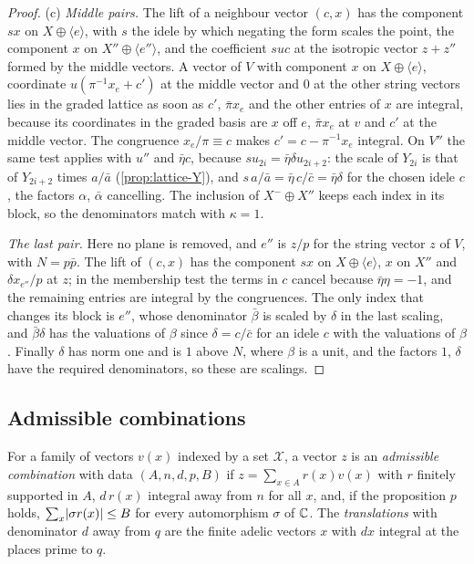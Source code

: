 \begin{proof}
(c) \emph{Middle pairs.} The lift of a neighbour vector $(c,x)$ has the component $sx$ on $X\oplus\langle e\rangle$, with $s$ the idele by which negating the form scales the point, the component $x$ on $X''\oplus\langle e''\rangle$, and the coefficient $suc$ at the isotropic vector $z+z''$ formed by the middle vectors. A vector of $V$ with component
$x$ on $X\oplus\langle e\rangle$, coordinate $u(\pi^{-1}x_e+c')$ at the middle vector and $0$ at the other string vectors lies in the graded lattice as soon as $c'$, $\bar\pi x_e$ and the other entries of $x$ are integral, because its coordinates in the graded basis are $x$ off $e$, $\bar\pi x_e$ at $v$ and $c'$ at the middle vector. The
congruence $x_e/\pi\equiv c$ makes $c'=c-\pi^{-1}x_e$ integral. On $V''$ the same test applies with $u''$ and $\bar\eta c$, because $su_{2i}=\bar\eta\delta u_{2i+2}$: the scale of $Y_{2i}$ is that of $Y_{2i+2}$ times $a/\bar a$ (\cref{prop:lattice-Y}), and $s\,a/\bar a=\bar\eta\,c/\bar c=\bar\eta\delta$ for the chosen idele
$c$, the factors $\alpha$, $\bar\alpha$ cancelling. The inclusion of $X^-\oplus X''$ keeps each index in its block, so the denominators match with $\kappa=1$.

\emph{The last pair.} Here no plane is removed, and $e''$ is $z/p$ for the string vector $z$ of $V$, with $N=p\bar p$. The lift of $(c,x)$ has the component $sx$ on $X\oplus\langle e\rangle$, $x$ on $X''$ and $\delta x_{e''}/p$ at $z$; in the membership test the terms in $c$ cancel because $\bar\eta\eta=-1$, and the remaining entries are integral by
the congruences. The only index that changes its block is $e''$, whose denominator $\bar\beta$ is scaled by $\delta$ in the last scaling, and $\bar\beta\delta$ has the valuations of $\beta$ since $\delta=c/\bar c$ for an idele $c$ with the valuations of $\beta$. Finally $\delta$ has norm one and is $1$ above $N$, where $\beta$ is a unit, and the
factors $1$, $\delta$ have the required denominators, so these are scalings.
\end{proof}

\subsection{Admissible combinations}\label{ss:admissible}
For a family of vectors $v(x)$ indexed by a set $\mathcal X$, a vector $z$ is an \emph{admissible combination} with data
$(A,n,d,p,B)$ if $z=\sum_{x\in A}r(x)v(x)$ with $r$ finitely supported in $A$, $d\,r(x)$ integral away from $n$ for all $x$, and,
if the proposition $p$ holds, $\sum_x\lvert \sigma r(x)\rvert\le B$ for every automorphism $\sigma$ of $\mathbb{C}$. The \emph{translations}
with denominator $d$ away from $q$ are the finite adelic vectors $x$ with $dx$ integral at the places prime to $q$.


